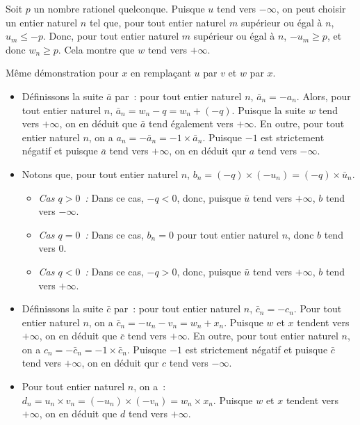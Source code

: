     Soit $p$ un nombre rationel quelconque.
    Puisque $u$ tend vers $-\infty$, on peut choisir un entier naturel $n$ tel que, pour tout entier naturel $m$ supérieur ou égal à $n$, $u_m \leq -p$. 
    Donc, pour tout entier naturel $m$ supérieur ou égal à $n$, $- u_m \geq p$, et donc $w_n \geq p$.
    Cela montre que $w$ tend vers $+\infty$.

    Même démonstration pour $x$ en remplaçant $u$ par $v$ et $w$ par $x$.

    \begin{itemize}[nosep]
        \item Définissons la suite $\bar{a}$ par : pour tout entier naturel $n$, $\bar{a}_n = - a_n$.
            Alors, pour tout entier naturel $n$, $\bar{a}_n = w_n - q = w_n + (-q)$.
            Puisque la suite $w$ tend vers $+\infty$, on en déduit que $\bar{a}$ tend également vers $+\infty$.
            En outre, pour tout entier naturel $n$, on a $a_n = - \bar{a}_n = -1 \times \bar{a}_n$.
            Puisque $-1$ est strictement négatif et puisque $\bar{a}$ tend vers $+\infty$, on en déduit qur $a$ tend vers $-\infty$.
        \item Notons que, pour tout entier naturel $n$, $b_n = (-q) \times (-u_n) = (-q) \times \bar{u}_n$. 
            \begin{itemize}[nosep]
                \item \emph{Cas $q > 0$ :} Dans ce cas, $-q < 0$, donc, puisque $\bar{u}$ tend vers $+\infty$, $b$ tend vers $-\infty$.
                \item \emph{Cas $q = 0$ :} Dans ce cas, $b_n = 0$ pour tout entier naturel $n$, donc $b$ tend vers $0$.
                \item \emph{Cas $q < 0$ :} Dans ce cas, $-q > 0$, donc, puisque $\bar{u}$ tend vers $+\infty$, $b$ tend vers $+\infty$.
            \end{itemize}
        \item Définissons la suite $\bar{c}$ par : pour tout entier naturel $n$, $\bar{c}_n = - c_n$.
            Pour tout entier naturel $n$, on a $\bar{c}_n = -u_n - v_n = w_n + x_n$.
            Puisque $w$ et $x$ tendent vers $+\infty$, on en déduit que $\bar{c}$ tend vers $+\infty$.
            En outre, pour tout entier naturel $n$, on a $c_n = - \bar{c}_n = -1 \times \bar{c}_n$.
            Puisque $-1$ est strictement négatif et puisque $\bar{c}$ tend vers $+\infty$, on en déduit qur $c$ tend vers $-\infty$.
        \item Pour tout entier naturel $n$, on a : $d_n = u_n \times v_n = (- u_n) \times (- v_n) = w_n \times x_n$.
            Puisque $w$ et $x$ tendent vers $+\infty$, on en déduit que $d$ tend vers $+\infty$.
    \end{itemize}

